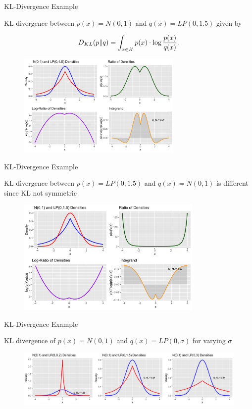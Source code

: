 \documentclass[11pt,compress,t,notes=noshow, xcolor=table]{beamer}
\begin{document}
\begin{vbframe} {KL-Divergence Example}

KL divergence between $p(x)=N(0,1)$ and $q(x)=LP(0, 1.5)$ given by

  $$ D_{KL}(p \| q) = \int_{x \in \mathcal{X}} p(x) \cdot \log \frac{p(x)}{q(x)}. $$

\begin{figure}
\includegraphics[width = 8cm ]{figure/kl_calculation_plot_1.png} 
\end{figure}

\end{vbframe}

\begin{vbframe} {KL-Divergence Example}

KL divergence between $p(x)=LP(0, 1.5)$ and $q(x)=N(0,1)$ is different since KL not symmetric

\begin{figure}
\includegraphics[width = 9cm ]{figure/kl_calculation_plot_2.png} 
\end{figure}

\end{vbframe}

\begin{vbframe} {KL-Divergence Example}

KL divergence of $p(x)=N(0,1)$ and $q(x)=LP(0, \sigma)$ for varying $\sigma$ \\
\lz
\begin{figure}
\includegraphics[width = 12cm ]{figure/kl_norm_lp.png} 
\end{figure}


\end{vbframe}
\end{document}
